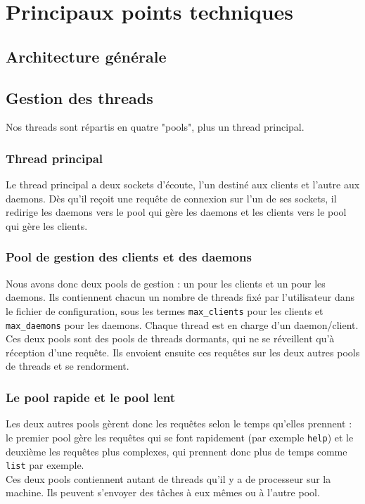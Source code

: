 \section{Principaux points techniques}


\subsection{Architecture générale}




\subsection{Gestion des threads}
Nos threads sont répartis en quatre "pools", plus un thread principal.

\subsubsection{Thread principal}
Le thread principal a deux sockets d'écoute, l'un destiné aux clients et
l'autre aux daemons. Dès qu'il reçoit une requête de connexion sur l'un de
ses sockets, il redirige les daemons vers le pool qui gère les daemons et
les clients vers le pool qui gère les clients.

\subsubsection{Pool de gestion des clients et des daemons}
Nous avons donc deux pools de gestion : un pour les clients et un pour
les daemons. Ils contiennent chacun un nombre de threads fixé par
l'utilisateur dans le fichier de configuration, sous les termes 
\verb$max_clients$ pour les clients et \verb$max_daemons$ pour les daemons.
Chaque thread est en charge d'un daemon/client. \\
Ces deux pools sont des pools de threads dormants, qui ne se réveillent qu'à 
réception d'une requête. Ils envoient ensuite ces requêtes sur les deux autres
pools de threads et se rendorment.

\subsubsection{Le pool rapide et le pool lent}
Les deux autres pools gèrent donc les requêtes selon le temps qu'elles 
prennent : le premier pool gère les requêtes qui se font rapidement 
(par exemple \verb$help$) et le deuxième les requêtes plus complexes, qui 
prennent donc plus de temps comme \verb$list$ par exemple.\\
Ces deux pools contiennent autant de threads qu'il y a de processeur sur la
machine. Ils peuvent s'envoyer des tâches à eux mêmes ou à l'autre pool.

